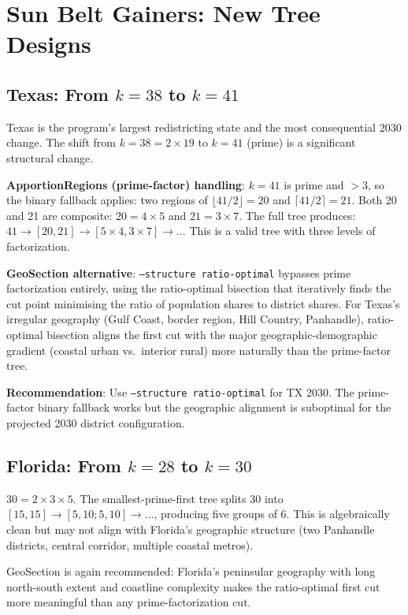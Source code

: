 \section{Sun Belt Gainers: New Tree Designs}

\subsection{Texas: From $k = 38$ to $k = 41$}

Texas is the program's largest redistricting state and the most consequential
2030 change. The shift from $k = 38 = 2\times19$ to $k = 41$ (prime) is a
significant structural change.

\textbf{ApportionRegions (prime-factor) handling}: $k = 41$ is prime and $> 3$,
so the binary fallback applies: two regions of $\lfloor 41/2 \rfloor = 20$ and
$\lceil 41/2 \rceil = 21$.
Both 20 and 21 are composite: $20 = 4\times5$ and $21 = 3\times7$.
The full tree produces: $41 \to [20, 21] \to [5\times4, 3\times7] \to \ldots$
This is a valid tree with three levels of factorization.

\textbf{GeoSection alternative}: \texttt{--structure ratio-optimal} bypasses
prime factorization entirely, using the ratio-optimal bisection that iteratively
finds the cut point minimising the ratio of population shares to district shares.
For Texas's irregular geography (Gulf Coast, border region, Hill Country,
Panhandle), ratio-optimal bisection aligns the first cut with the major
geographic-demographic gradient (coastal urban vs.\ interior rural) more naturally
than the prime-factor tree.

\textbf{Recommendation}: Use \texttt{--structure ratio-optimal} for TX 2030.
The prime-factor binary fallback works but the geographic alignment is suboptimal
for the projected 2030 district configuration.

\subsection{Florida: From $k = 28$ to $k = 30$}

$30 = 2\times3\times5$. The smallest-prime-first tree splits 30 into
$[15, 15] \to [5, 10; 5, 10] \to \ldots$, producing five groups of 6.
This is algebraically clean but may not align with Florida's geographic
structure (two Panhandle districts, central corridor, multiple coastal metros).

GeoSection is again recommended: Florida's peninsular geography with long
north-south extent and coastline complexity makes the ratio-optimal first cut
more meaningful than any prime-factorization cut.

